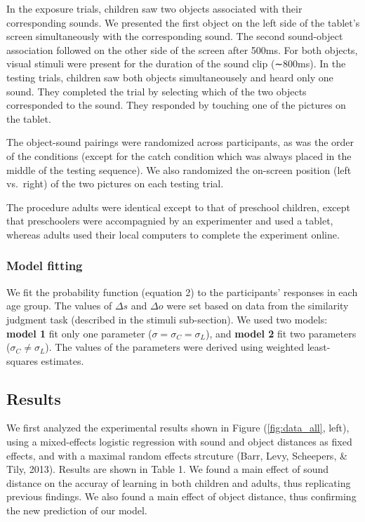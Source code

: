 \documentclass[10pt, letterpaper]{article}
\begin{document}
In the exposure trials, children saw two objects associated with their
corresponding sounds. We presented the first object on the left side of
the tablet's screen simultaneously with the corresponding sound. The
second sound-object association followed on the other side of the screen
after 500ms. For both objects, visual stimuli were present for the
duration of the sound clip (∼800ms). In the testing trials, children saw
both objects simultaneousely and heard only one sound. They completed
the trial by selecting which of the two objects corresponded to the
sound. They responded by touching one of the pictures on the tablet.

The object-sound pairings were randomized across participants, as was
the order of the conditions (except for the catch condition which was
always placed in the middle of the testing sequence). We also randomized
the on-screen position (left vs.~right) of the two pictures on each
testing trial.

The procedure adults were identical except to that of preschool
children, except that preschoolers were accompagnied by an experimenter
and used a tablet, whereas adults used their local computers to complete
the experiment online.

\subsubsection{Model fitting}\label{model-fitting}

We fit the probability function (equation 2) to the participants'
responses in each age group. The values of \(\Delta s\) and \(\Delta o\)
were set based on data from the similarity judgment task (described in
the stimuli sub-section). We used two models: \textbf{model 1} fit only
one parameter (\(\sigma = \sigma_C =\sigma_L\)), and \textbf{model 2}
fit two parameters (\(\sigma_C \neq \sigma_L\)). The values of the
parameters were derived using weighted least-squares estimates.

\subsection{Results}\label{results}

We first analyzed the experimental results shown in Figure
(\ref{fig:data_all}, left), using a mixed-effects logistic regression
with sound and object distances as fixed effects, and with a maximal
random effects strcuture (Barr, Levy, Scheepers, \& Tily, 2013). Results
are shown in Table 1. We found a main effect of sound distance on the
accuray of learning in both children and adults, thus replicating
previous findings. We also found a main effect of object distance, thus
confirming the new prediction of our model.
\end{document}
